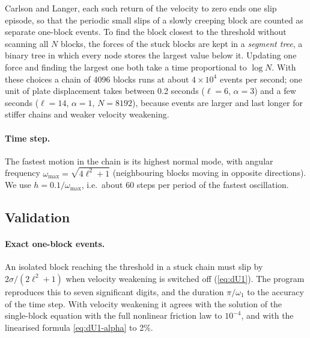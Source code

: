 Carlson and Langer, each such return of the velocity to zero ends one slip episode, so that the periodic small slips of a slowly creeping block are
counted as separate one-block events.
To find the block closest to the threshold without scanning all $N$ blocks, the forces of the stuck blocks are kept in a \emph{segment tree}, a
binary tree in which every node stores the largest value below it. Updating one force and finding the largest one both take a time proportional to
$\log N$. With these choices a chain of 4096 blocks runs at about $4\times10^4$ events per second; one unit of plate displacement takes between
0.2 seconds ($\ell=6$, $\alpha=3$) and a few seconds ($\ell=14$, $\alpha=1$, $N=8192$), because events are larger and last longer for stiffer chains and
weaker velocity weakening.

\paragraph{Time step.} The fastest motion in the chain is its highest normal mode, with angular frequency $\omega_{\max} = \sqrt{4\ell^2+1}$ (neighbouring
blocks moving in opposite directions). We use $h = 0.1/\omega_{\max}$, i.e.\ about 60 steps per period of the fastest oscillation.

\subsection{Validation}

\paragraph{Exact one-block events.} An isolated block reaching the threshold in a stuck chain must slip by $2\sigma/(2\ell^2+1)$ when velocity weakening is
switched off (\cref{eq:dU1}). The program reproduces this to seven significant digits, and the duration $\pi/\omega_1$ to the accuracy of the time step. With
velocity weakening it agrees with the solution of the single-block equation with the full nonlinear friction law to $10^{-4}$, and with the linearised
formula \cref{eq:dU1-alpha} to 2\%.

